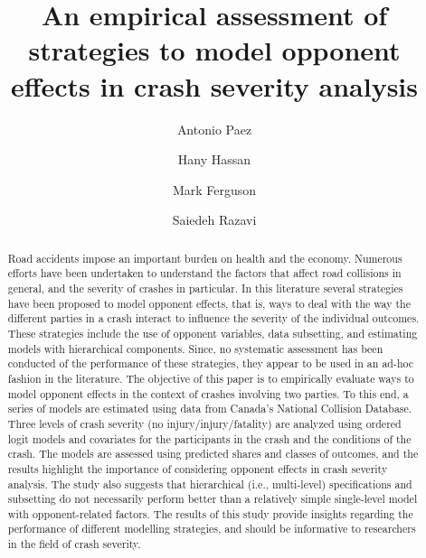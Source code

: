 \documentclass[]{elsarticle} %
\begin{document}
\begin{frontmatter}

  \title{An empirical assessment of strategies to model opponent effects in crash
severity analysis}
    \author[McMaster University]{Antonio Paez}
    \author[Louisiana State University]{Hany Hassan}
    \author[McMaster University]{Mark Ferguson}
    \author[McMaster University]{Saiedeh Razavi}
      \address[McMaster University]{McMaster Institute for Transportation and Logistics, McMaster
University, 1280 Main Street West, Hamilton, Ontario, Canada L8S 4K1}
    \address[Louisiana State University]{Department of Civil and Environmental Engineering, Louisiana State
University, Baton Rouge, Louisiana, USA 70803}
    
  \begin{abstract}
  Road accidents impose an important burden on health and the economy.
  Numerous efforts have been undertaken to understand the factors that
  affect road collisions in general, and the severity of crashes in
  particular. In this literature several strategies have been proposed to
  model opponent effects, that is, ways to deal with the way the different
  parties in a crash interact to influence the severity of the individual
  outcomes. These strategies include the use of opponent variables, data
  subsetting, and estimating models with hierarchical components. Since,
  no systematic assessment has been conducted of the performance of these
  strategies, they appear to be used in an ad-hoc fashion in the
  literature. The objective of this paper is to empirically evaluate ways
  to model opponent effects in the context of crashes involving two
  parties. To this end, a series of models are estimated using data from
  Canada's National Collision Database. Three levels of crash severity (no
  injury/injury/fatality) are analyzed using ordered logit models and
  covariates for the participants in the crash and the conditions of the
  crash. The models are assessed using predicted shares and classes of
  outcomes, and the results highlight the importance of considering
  opponent effects in crash severity analysis. The study also suggests
  that hierarchical (i.e., multi-level) specifications and subsetting do
  not necessarily perform better than a relatively simple single-level
  model with opponent-related factors. The results of this study provide
  insights regarding the performance of different modelling strategies,
  and should be informative to researchers in the field of crash severity.
  \end{abstract}
  
 \end{frontmatter}
\end{document}
